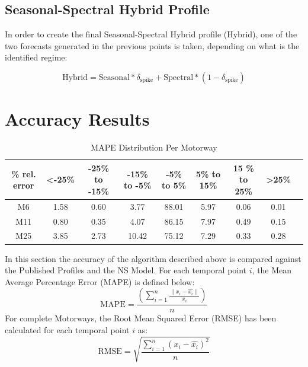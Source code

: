 \documentclass[conference, letterpaper]{IEEEtran}
\begin{document}
\subsection{Seasonal-Spectral Hybrid Profile}
In order to create the final Seasonal-Spectral Hybrid profile (Hybrid), one of the two forecasts generated in the previous points is taken, depending on what is the identified regime: 

\begin{equation}
\textrm{Hybrid} = \textrm{Seasonal} * \delta_{\textrm{spike}} + \textrm{Spectral} * (1 - \delta_{\textrm{spike}})
\end{equation}

\section{Accuracy Results}
\begin{table}[bp]
	\caption{MAPE Distribution Per Motorway}
	\centering
	\begin{center}
		\begin{tabular}{|C|C|C|C|C|C|C|C|C|}
			\hline
			\textbf{\% rel. error}&{\textless -25\%}&{-25\%\textbf{ to }-15\%}&{-15\%\textbf{ to }-5\%}&{-5\%\textbf{ to }5\%}&{5\%\textbf{ to }15\%}&{15 \%\textbf{ to }25\%}&{\textgreater 25\%}\\
			\hline
			M6& 1.58& 0.60& 3.77& 88.01& 5.97& 0.06& 0.01\\
			\hline
			M11& 0.80& 0.35& 4.07& 86.15& 7.97& 0.49& 0.15\\
			\hline
			M25& 3.85& 2.73& 10.42& 75.12& 7.29& 0.33& 0.28\\
			\hline
		\end{tabular}
		\label{mapeglobal}
	\end{center}
\end{table}
  
In this section the accuracy of the algorithm described above is compared against the Published Profiles and the NS Model. 
For each temporal point $i$, the Mean Average Percentage Error (MAPE) is defined below:
\begin{equation}
\textrm{MAPE} =\frac{ \left( \sum_{i=1}^{n} \frac{\|x_i - \hat{x_i}\|}{x_i}\right)}{n}
\end{equation}
For complete Motorways, the Root Mean Squared Error (RMSE) has been calculated for each temporal point $i$ as:
\begin{equation}
\textrm{RMSE} = \sqrt{\frac{\sum_{i=1}^{n} (x_i - \hat{x_i})^2}{n}}
\end{equation}
\end{document}
